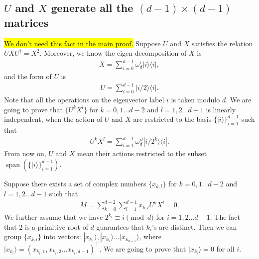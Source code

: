 \documentclass[11pt,letterpaper]{article}
\newcommand{\ket}[1]{|#1\rangle}
\newcommand{\ketbra}[2]{|#1\rangle\langle#2|}
\DeclareMathOperator{\spn}{span}
\newcommand{\1}{\mathbb{1}}
\theoremstyle{definition}
\begin{document}
\subsection{$U$ and $X$ generate all the $(d-1)\times(d-1)$ matrices}
\hl{We don't need this fact in the main proof.}
Suppose $U$ and $X$ satisfies the relation $UXU^\dagger = X^2$. Moreover, we know the eigen-decomposition
of $X$ is 
\begin{align}
	X = \sum_{i=0}^{d-1} \omega_d^i \ketbra{i}{i},
\end{align}
and the form of $U$ is
\begin{align}
	U =\sum_{i=0}^{d-1} \ketbra{i/2}{i}.
\end{align}
Note that all the operations on the eigenvector label $i$ is taken modulo $d$.
We are going to prove that $\{ U^k X^l \}$ for $k=0,1\dots d-2$ and $l = 1,2\dots d-1$ is linearly independent,
when the action of $U$ and $X$ are restricted to the basis $\{\ket{i}\}_{i=1}^{d-1}$ such that 
\begin{align}
	U^kX^l  = \sum_{i=1}^{d-1} \omega_d^{il} \ketbra{i/2^k}{i}.
\end{align}
From now on, $U$ and $X$ mean their actions restricted to the subset $\spn(\{\ket{i}\}_{i=1}^{d-1})$.

Suppose there exists a set of complex numbers $\{ x_{k,l} \}$ for $k=0,1\dots d-2$ and $l = 1,2\dots d-1$
such that 
\begin{align}
	M = \sum_{k=0}^{d-2} \sum_{l=1}^{d-1} x_{k,l} U^k X^l = 0. 
\end{align}
We further assume that we have $2^{k_i} \equiv i \pmod{d}$ for $i = 1,2\dots d-1$.
The fact that $2$ is a primitive root of $d$ guarantees that $k_i$'s are distinct.
Then we can group $\{x_{k,l}\}$ into vectors: $\ket{x_{k_1}}, \ket{x_{k_2}} \dots \ket{x_{k_{d-1}}}$,
where $\ket{x_{k_i}}= (x_{k_i, 1}, x_{k_i, 2} \dots x_{k_i, d-1})^\intercal$.
We are going to prove that $\ket{x_{k_i}} = 0$ for all $i$.
\end{document}
